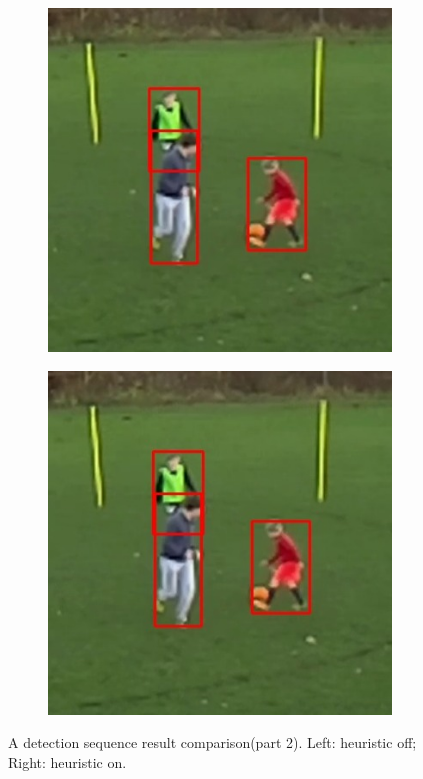 \documentclass{article}
\begin{document}
\begin{figure}[h!]
\begin{subfigure}[b]{0.5\linewidth}
	\includegraphics[scale=0.4]{report/pic/3_new/off_seq_6.jpg} 
  \end{subfigure}
  \begin{subfigure}[b]{0.5\linewidth}
  \centering
	\includegraphics[scale=0.4]{report/pic/3_new/on_seq_6.jpg} 
  \end{subfigure}
  \caption{A detection sequence result comparison(part 2). Left: heuristic off; Right: heuristic on.}
\end{figure}
\end{document}
